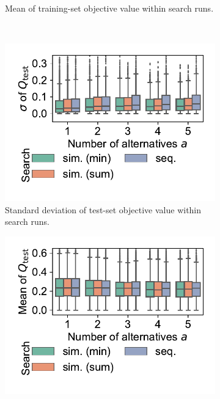 \documentclass{article}
\theoremstyle{definition}
\begin{document}
\begin{figure}[p]
\begin{subfigure}[t]{0.48\textwidth}
		\caption{Mean of training-set objective value within search runs.}
		\label{fig:afs:impact-search-mean-train-objective}
	\end{subfigure}
	\\ \vspace{\baselineskip}
	\begin{subfigure}[t]{0.48\textwidth}
		\centering
		\includegraphics[width=\textwidth, trim=15 25 15 15, clip]{plots/afs-impact-search-stddev-test-objective.pdf}
		\caption{Standard deviation of test-set objective value within search runs.}
		\label{fig:afs:impact-search-stddev-test-objective}
	\end{subfigure}
	\hfill
	\begin{subfigure}[t]{0.48\textwidth}
		\centering
		\includegraphics[width=\textwidth, trim=15 25 15 15, clip]{plots/afs-impact-search-mean-test-objective.pdf}

\end{subfigure}
\end{figure}
\end{document}
